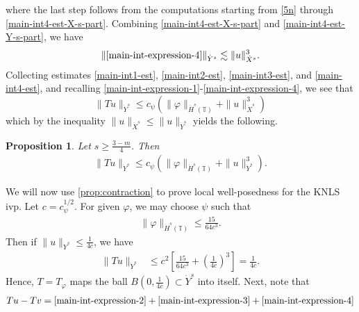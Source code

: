\documentclass[12pt,reqno]{amsart}
\numberwithin{equation}{section}  %
\numberwithin{figure}{section}
\newcommand{\ci}{\mathbb{T}}
\newcommand{\vp}{\varphi}
\theoremstyle{plain}
\newtheorem{proposition}{Proposition}
\theoremstyle{definition}
\theoremstyle{remark}
\begin{document}
%
%
where the last step follows from the computations starting from \eqref{5n}
through \eqref{main-int4-est-X-s-part}.
Combining \eqref{main-int4-est-X-s-part} and \eqref{main-int4-est-Y-s-part}, we
have
%
%
\begin{equation}
\label{main-int4-est}
	\begin{split}
		\|\eqref{main-int-expression-4}\|_{\dot{Y}^s} \lesssim \|u\|_{\dot{X}^s}^{3}.
	\end{split}
\end{equation}
%
%
Collecting estimates \eqref{main-int1-est}, \eqref{main-int2-est}, 
\eqref{main-int3-est}, and \eqref{main-int4-est}, and recalling 
\eqref{main-int-expression-1}-\eqref{main-int-expression-4}, we see that
$$\|Tu\|_{\dot{Y}^s} \le c_\psi \left( \|\vp \|_{\dot{H}^s(\ci)} + \|u\|_{\dot{X}^s}^3 \right )$$ 
which by the inequality $\|u\|_{\dot{X}^s} \le \|u\|_{\dot{Y}^s}$ yields the following.
%
%				 
%
\begin{proposition}
\label{prop:contraction}
Let $s \ge \frac{3-m}{4}$. Then
%
\begin{equation*}
	\begin{split}
		\|Tu\|_{\dot{Y}^s} \le c_\psi \left( \|\vp \|_{\dot{H}^s(\ci)} + \|u\|_{\dot{Y}^s}^3 
		\right).
	\end{split}
\end{equation*}
%
\end{proposition}
We will now use \autoref{prop:contraction} to prove local well-posedness for the 
KNLS ivp. Let $c = c_{\psi}^{1/2}$. For given $\vp$, we may choose $\psi$ such
that 
%
\begin{equation*}
	\begin{split}
		\|\vp\|_{\dot{H}^s(\ci)} \le \frac{15}{64c^3}.
	\end{split}
\end{equation*}
%
Then if $\|u\|_{\dot{Y}^s} \le \frac{1}{4c}$, we have
%
\begin{equation*}
	\begin{split}
		\|T u \|_{\dot{Y}^s} 
		& \le c^2 \left[ \frac{15}{64c^3} + \left( 
		\frac{1}{4c} \right)^3 \right]
		=  \frac{1}{4c}.
	\end{split}
\end{equation*}
%
Hence, $T=T_{\vp}$ maps the ball $B\left( 0, \frac{1}{4c} \right) \subset \dot{Y}^s$ into 
itself. Next, note that
%
\begin{equation*}
	\begin{split}
		Tu - Tv = \eqref{main-int-expression-2} + \eqref{main-int-expression-3} 
		+ \eqref{main-int-expression-4}
	\end{split}
\end{equation*}
\end{document}

